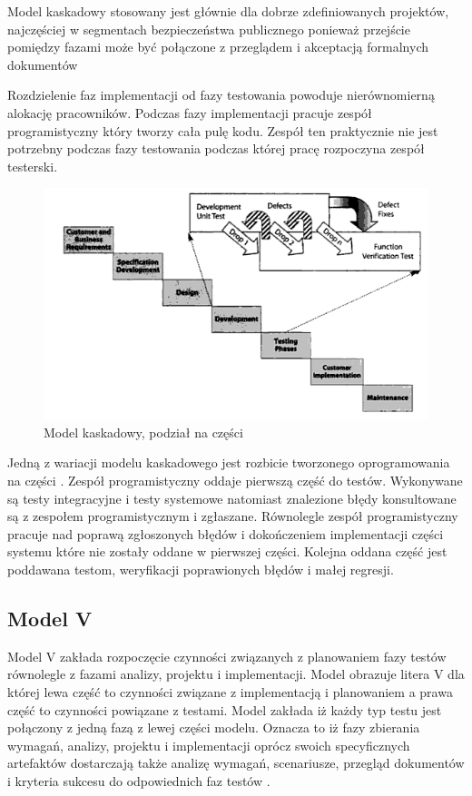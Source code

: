 Model kaskadowy stosowany jest głównie dla dobrze zdefiniowanych projektów, najczęściej w segmentach bezpieczeństwa publicznego ponieważ przejście pomiędzy fazami może być połączone z przeglądem i akceptacją formalnych dokumentów

Rozdzielenie faz implementacji od fazy testowania powoduje nierównomierną alokację pracowników. Podczas fazy implementacji pracuje zespół programistyczny który tworzy cała pulę kodu. Zespół ten praktycznie nie jest potrzebny podczas fazy testowania podczas której pracę rozpoczyna zespół testerski.
\begin{figure}[h]
\centerline{\includegraphics[scale=0.5]{img/water-wheel.png}}
\caption{Model kaskadowy, podział na części  \cite{TestingMatt}}
\label{fig:kaskadowyCzesci}
\end{figure}

Jedną z wariacji modelu kaskadowego jest rozbicie tworzonego oprogramowania na części \cite{TestingMatt}. 
Zespół programistyczny oddaje pierwszą część do testów. Wykonywane są testy integracyjne i testy systemowe natomiast znalezione błędy konsultowane są z zespołem programistycznym i zgłaszane. Równolegle zespół programistyczny pracuje nad poprawą zgłoszonych błędów i dokończeniem implementacji części systemu które nie zostały oddane w pierwszej części. Kolejna oddana część jest poddawana testom, weryfikacji poprawionych błędów i małej regresji.

\subsection{Model V}


Model V zakłada rozpoczęcie czynności związanych z planowaniem fazy testów równolegle z fazami analizy, projektu i implementacji. Model obrazuje litera V dla której lewa część to czynności związane z implementacją i planowaniem a prawa część to czynności powiązane z testami. Model zakłada iż każdy typ testu jest połączony z jedną fazą z lewej części modelu. Oznacza to iż fazy zbierania wymagań, analizy, projektu i implementacji oprócz swoich specyficznych artefaktów dostarczają także analizę wymagań, scenariusze, przegląd dokumentów i kryteria sukcesu do odpowiednich faz testów \cite{otss}.

